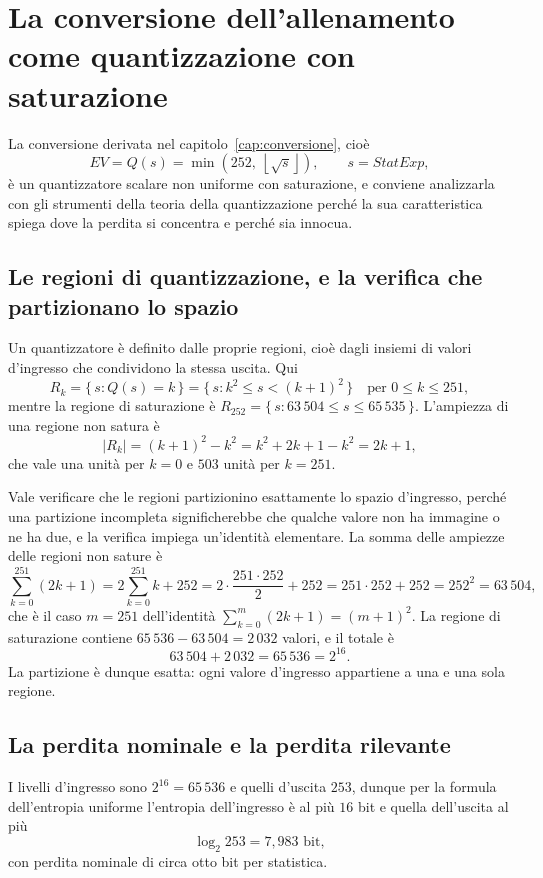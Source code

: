 \section{La conversione dell'allenamento come quantizzazione con saturazione}

La conversione derivata nel capitolo~\ref{cap:conversione}, cioè
\[
EV = Q(s) = \min\left(252,\ \left\lfloor \sqrt{s} \right\rfloor\right), \qquad s = StatExp,
\]
è un quantizzatore scalare non uniforme con saturazione, e conviene analizzarla con gli strumenti della teoria della quantizzazione \cite{gray-neuhoff} perché la sua caratteristica spiega dove la perdita si concentra e perché sia innocua.

\subsection{Le regioni di quantizzazione, e la verifica che partizionano lo spazio}

Un quantizzatore è definito dalle proprie regioni, cioè dagli insiemi di valori d'ingresso che condividono la stessa uscita. Qui
\[
R_k = \{\, s : Q(s) = k \,\} = \{\, s : k^2 \le s < (k+1)^2 \,\} \quad \text{per } 0 \le k \le 251,
\]
mentre la regione di saturazione è $R_{252} = \{\, s : 63\,504 \le s \le 65\,535 \,\}$. L'ampiezza di una regione non satura è
\[
|R_k| = (k+1)^2 - k^2 = k^2 + 2k + 1 - k^2 = 2k + 1,
\]
che vale una unità per $k = 0$ e $503$ unità per $k = 251$.

Vale verificare che le regioni partizionino esattamente lo spazio d'ingresso, perché una partizione incompleta significherebbe che qualche valore non ha immagine o ne ha due, e la verifica impiega un'identità elementare. La somma delle ampiezze delle regioni non sature è
\[
\sum_{k=0}^{251} (2k+1) = 2 \sum_{k=0}^{251} k + 252 = 2 \cdot \frac{251 \cdot 252}{2} + 252 = 251 \cdot 252 + 252 = 252^2 = 63\,504,
\]
che è il caso $m = 251$ dell'identità $\sum_{k=0}^{m} (2k+1) = (m+1)^2$. La regione di saturazione contiene $65\,536 - 63\,504 = 2\,032$ valori, e il totale è
\[
63\,504 + 2\,032 = 65\,536 = 2^{16}.
\]
La partizione è dunque esatta: ogni valore d'ingresso appartiene a una e una sola regione.

\subsection{La perdita nominale e la perdita rilevante}

I livelli d'ingresso sono $2^{16} = 65\,536$ e quelli d'uscita $253$, dunque per la formula dell'entropia uniforme l'entropia dell'ingresso è al più $16$ bit e quella dell'uscita al più
\[
\log_2 253 = 7{,}983 \text{ bit},
\]
con perdita nominale di circa otto bit per statistica.

